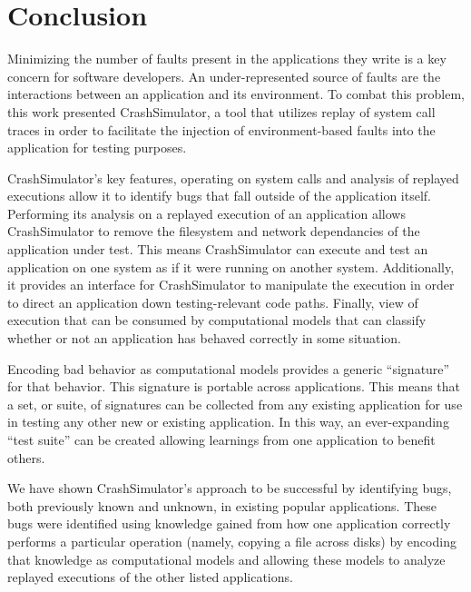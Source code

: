 \section{Conclusion}

Minimizing the number of faults present in the applications they write is a key concern for software developers.  An
under-represented source of faults are the interactions between an application and its environment.  To combat this
problem, this work presented CrashSimulator, a tool that utilizes replay of system call traces in order to facilitate the
injection of environment-based faults into the application for testing purposes.

CrashSimulator's key features, operating on system calls and analysis of replayed executions allow it to identify bugs
that fall outside of the application itself.  Performing its analysis on a replayed execution of an application allows
CrashSimulator to remove the filesystem and network dependancies of the application under test.  This means
CrashSimulator can execute and test an application on one system as if it were running on another system.  Additionally,
it provides an interface for CrashSimulator to manipulate the execution in order to direct an application down
testing-relevant code paths.  Finally, view of execution that can be consumed by computational models that can classify
whether or not an application has behaved correctly in some situation.

Encoding bad behavior as computational models provides a generic ``signature'' for that behavior.  This signature is
portable across applications.  This means that a set, or suite, of signatures can be collected from any existing
application for use in testing any other new or existing application.  In this way, an ever-expanding ``test suite'' can
be created allowing learnings from one application to benefit others.

We have shown CrashSimulator's approach to be successful by identifying bugs, both previously known and unknown, in
existing popular applications.  These bugs were identified using knowledge gained from how one application correctly
performs a particular operation (namely, copying a file across disks) by encoding that knowledge as computational models
and allowing these models to analyze replayed executions of the other listed applications.
